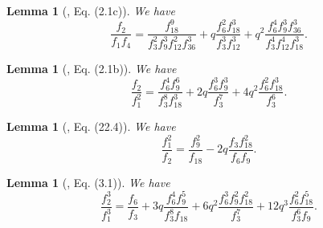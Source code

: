 \documentclass{amsart}
\newtheorem{lemma}[theorem]{Lemma}
\begin{document}

\begin{lemma}[\cite{Toh}, Eq. (2.1c)]
We have
\begin{equation}
\frac{f_{2}}{f_{1}f_{4}}  = \displaystyle\frac{f_{18}^{9}}{f_{3}^2f_{9}^3f_{12}^2f_{36}^3} + q\displaystyle\frac{f_{6}^2f_{18}^{3}}{f_{3}^3f_{12}^3} +q^2 \displaystyle\frac{f_{6}^4f_{9}^3f_{36}^{3}}{f_{3}^4f_{12}^4f_{18}^3}.   
\label{eq5}
\end{equation}
\end{lemma}

\begin{lemma}[\cite{Toh}, Eq. (2.1b)]
We have
\begin{equation}
\frac{f_{2}}{f_{1}^2} = \frac{f_{6}^4f_{9}^6}{f_{3}^8f_{18}^3} + 2q\displaystyle\frac{f_{6}^3f_{9}^3}{f_{3}^7} + 4q^2\displaystyle\frac{f_{6}^2f_{18}^3}{f_{3}^6}.   
\label{eq6}
\end{equation}
\end{lemma}

\begin{lemma}[\cite{B1}, Eq. (22.4)]
We have
\begin{equation}
\frac{f_{1}^2}{f_{2}} = \displaystyle\frac{f_{9}^2}{f_{18}} - 2q\displaystyle\frac{f_{3}f_{18}^2}{f_{6}f_{9}}.   
\label{eq7}
\end{equation}
\end{lemma}




\begin{lemma}[\cite{Toh}, Eq. (3.1)] We have
\begin{equation}
\displaystyle\frac{f_{2}^3}{f_{1}^3} = \displaystyle\frac{f_{6}}{f_{3}} +3q\displaystyle\frac{f_{6}^4f_{9}^{5}}{f_{3}^8f_{18}} +6q^2\displaystyle\frac{f_{6}^3f_{9}^{2}f_{18}^{2}}{f_{3}^7} +  12q^3\displaystyle\frac{f_{6}^2f_{18}^5}{f_{3}^6f_{9}}.  
\label{eq1062}
\end{equation}
\end{lemma}
\end{document}
